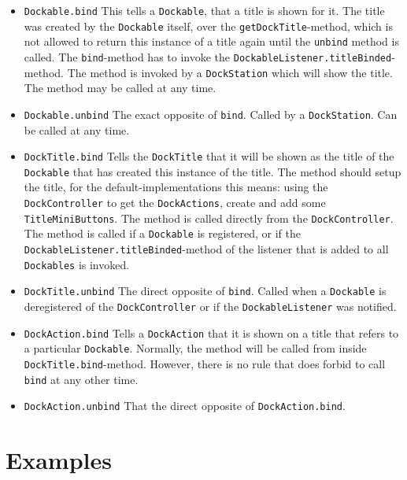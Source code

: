 \documentclass{article}
\begin{document}
\begin{itemize}
	\item \verb!Dockable.bind! This tells a \verb!Dockable!, that a title is shown for it. The title was created by the \verb!Dockable! itself, over the \verb!getDockTitle!-method, which is not allowed to return this instance of a title again until the \verb!unbind! method is called. The \verb!bind!-method has to invoke the \verb!DockableListener.titleBinded!-method. The method is invoked by a \verb!DockStation! which will show the title. The method may be called at any time.
	\item \verb!Dockable.unbind! The exact opposite of \verb!bind!. Called by a \verb!DockStation!. Can be called at any time.
	\item \verb!DockTitle.bind! Tells the \verb!DockTitle! that it will be shown as the title of the \verb!Dockable! that has created this instance of the title. The method should setup the title, for the default-implementations this means: using the \verb!DockController! to get the \verb!DockActions!, create and add some \verb!TitleMiniButtons!. The method is called directly from the \verb!DockController!. The method is called if a \verb!Dockable! is registered, or if the \verb!DockableListener.titleBinded!-method of the listener that is added to all \verb!Dockables! is invoked.
	\item \verb!DockTitle.unbind! The direct opposite of \verb!bind!. Called when a \verb!Dockable! is deregistered of the \verb!DockController! or if the \verb!DockableListener! was notified.
	\item \verb!DockAction.bind! Tells a \verb!DockAction! that it is shown on a title that refers to a particular \verb!Dockable!. Normally, the method will be called from inside \verb!DockTitle.bind!-method. However, there is no rule that does forbid to call \verb!bind! at any other time.
	\item \verb!DockAction.unbind! That the direct opposite of \verb!DockAction.bind!.
\end{itemize}


\section{Examples}
\end{document}
